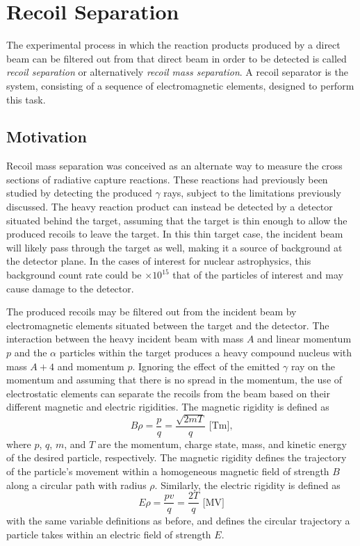 
\section{Recoil Separation}
\label{sec:ch01-recoil-separation}

The experimental process in which the reaction products produced by a direct
beam can be filtered out from that direct beam in order to be detected is
called \emph{recoil separation} or alternatively \emph{recoil mass separation}.
A recoil separator is the system, consisting of a sequence of electromagnetic
elements, designed to perform this task.

\subsection{Motivation}
\label{ssec:recoil-separation-motivation}

Recoil mass separation was conceived as an alternate way to measure the cross
sections of radiative capture reactions. These reactions had previously been
studied by detecting the produced $\gamma$ rays, subject to the limitations
previously discussed. The heavy reaction product can instead be detected by a
detector situated behind the target, assuming that the target is thin enough to
allow the produced recoils to leave the target. In this thin target case, the
incident beam will likely pass through the target as well, making it a source
of background at the detector plane. In the cases of interest for nuclear
astrophysics, this background count rate could be $\times 10^{15}$ that of the
particles of interest and may cause damage to the detector.

The produced recoils may be filtered out from the incident beam by
electromagnetic elements situated between the target and the detector. The
interaction between the heavy incident beam with mass $A$ and linear momentum
$p$ and the $\alpha$ particles within
the target produces a heavy compound nucleus with mass $A + 4$ and momentum
$p$. Ignoring the effect of the emitted $\gamma$ ray on the momentum and
assuming that there is no spread in the momentum, the use of electrostatic
elements can separate the recoils from the beam based on their different
magnetic and electric rigidities. The magnetic rigidity is defined as
\begin{equation}
    \label{eq:brho}
    B\rho = \frac{p}{q} = \frac{\sqrt{2mT}}{q}\textrm{ [Tm],}
\end{equation}
where $p$, $q$, $m$, and $T$ are the momentum, charge state, mass, and kinetic
energy of the desired particle, respectively. The magnetic rigidity
defines the trajectory of the particle's movement within a homogeneous magnetic
field of strength $B$ along a circular path with radius $\rho$. Similarly, the
electric rigidity is defined as
\begin{equation}
    \label{eq:erho}
    E\rho = \frac{pv}{q} = \frac{2T}{q}\textrm{ [MV]}
\end{equation}
with the same variable definitions as before, and defines the circular
trajectory a particle takes within an electric field of strength $E$.

